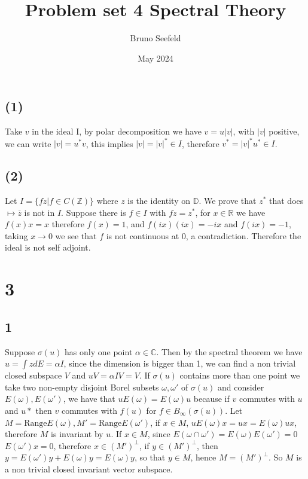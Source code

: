 \documentclass{article}
\title{Problem set 4 Spectral Theory}
\author{Bruno Seefeld}
\date{May 2024}
\begin{document}
\maketitle





\section{}
\subsection*{(1)}
Take $v$ in the ideal I, by polar decomposition we have $v=u|v|$, with $|v|$ positive, we can write $|v|=u^* v$, this implies $|v|=|v|^\ast \in I$, therefore 
$v^\ast=|v|^\ast u^*\in I$.

\subsection*{(2)}

Let $I=\{fz|f\in C(\mathbb{Z})\}$ where $z$ is the identity on $\mathbb{D}$. We prove that $z^\ast$ that does $\mapsto \overline{z}$ is not in $I$. Suppose 
there is $f\in I$ with $fz=z^\ast$, for $x\in \mathbb{R}$ we have $f(x)x=x$ therefore $f(x)=1$, and $f(ix)(ix)=-ix$ and $f(ix)=-1$, taking $x\to 0$ we see that $f$ is 
not continuous at $0$, a contradiction. Therefore the ideal is not self adjoint.  



\section*{3}
\subsection*{1}
Suppose $\sigma(u)$ has only one point $\alpha\in \mathbb{C}$. Then by the spectral theorem we have 
$u=\int z dE=\alpha I$, since the dimension is bigger than 1, we can find
a non trivial closed subspace $V$ and $uV=\alpha I V=V$.
If $\sigma(u)$ contains more than one point we take two non-empty disjoint Borel subsets 
$\omega,\omega'$ of $\sigma(u)$ and consider $E(\omega),E(\omega')$, we have
that $uE(\omega)=E(\omega)u$ because if $v$ commutes with $u$ and $u*$
then $v$ commutes with $f(u)$ for $f\in B_{\infty}(\sigma(u))$. Let $M=\text
{Range} E(\omega), M'=\text
{Range} E(\omega')$, if $x\in M$, $uE(\omega)x=ux=E(\omega)ux$, therefore $M$
is invariant by $u$. If $x\in M$, since $E(\omega\cap\omega')=E(\omega)E(\omega')=0$
$E(\omega')x=0$, therefore $x\in (M')^\perp$, if $y\in (M')^\perp$, then
$y=E(\omega')y+E(\omega)y=E(\omega)y$, so that $y\in M$, hence $M=(M')^\perp$. 
So $M$ is a non trivial closed invariant vector subspace.
\end{document}
